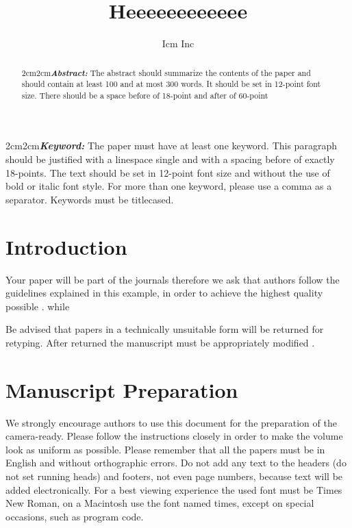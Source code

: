 \documentclass[final,3p]{CSP}
\begin{document}
\begin{frontmatter}

\title{Heeeeeeeeeeee}

\author[mymainaddress,mysecondaryaddress]{Icm Inc}


\address[mymainaddress]{1600 John F Kennedy Boulevard, Philadelphia}
\address[mysecondaryaddress]{360 Park Avenue South, New York}
\begin{keyword}\rm
\begin{adjustwidth}{2cm}{2cm}{\itshape\textbf{Keyword:}}  
The paper must have at least one keyword. This paragraph should be justified with a linespace single and with a spacing before of exactly 18-points. The text should be set in 12-point font size and without the use of bold or italic font style. For more than one keyword, please use a comma as a separator. Keywords must be titlecased.
\end{adjustwidth}
\end{keyword}

\begin{abstract}\rm
\begin{adjustwidth}{2cm}{2cm}{\itshape\textbf{Abstract:}} 
The abstract should summarize the contents of the paper and should contain at least 100 and at most 300 words. It should be set in 12-point font size. There should be a space before of 18-point and after of 60-point
\end{adjustwidth}
\end{abstract}
\end{frontmatter}

\section{Introduction}
\label{}
\noindent
Your paper will be part of the journals therefore we ask that authors follow the guidelines explained in this example, in order to achieve the highest quality possible \cite{Dirac1953888}. while

Be advised that papers in a technically unsuitable form will be returned for retyping. After returned the manuscript must be appropriately modified \cite{Feynman1963118}.

\section{	Manuscript Preparation}
\noindent
We strongly encourage authors to use this document for the preparation of the camera-ready. Please follow the instructions closely in order to make the volume look as uniform as possible.
Please remember that all the papers must be in English and without orthographic errors.
Do not add any text to the headers (do not set running heads) and footers, not even page numbers, because text will be added electronically.
For a best viewing experience the used font must be Times New Roman, on a Macintosh use the font named times, except on special occasions, such as program code.
\end{document}
